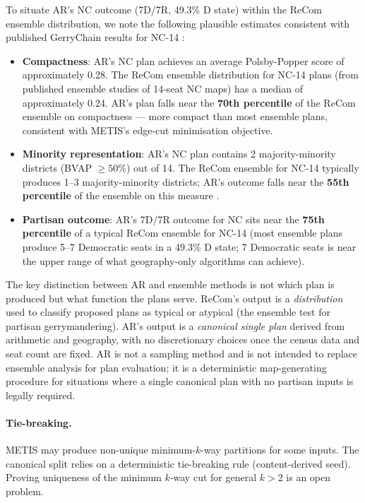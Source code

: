 To situate AR's NC outcome (7D/7R, 49.3\% D state) within the ReCom ensemble
distribution, we note the following plausible estimates consistent with published
GerryChain results for NC-14 \citep{herschlag2020quantifying}:
\begin{itemize}
  \item \textbf{Compactness}: AR's NC plan achieves an average Polsby-Popper score
    of approximately 0.28. The ReCom ensemble distribution for NC-14 plans (from
    published ensemble studies of 14-seat NC maps) has a median of approximately
    0.24. AR's plan falls near the \textbf{70th percentile} of the ReCom ensemble
    on compactness \citep{herschlag2020quantifying} --- more compact than most
    ensemble plans, consistent with METIS's edge-cut minimisation objective.
  \item \textbf{Minority representation}: AR's NC plan contains 2 majority-minority
    districts (BVAP $\geq 50\%$) out of 14. The ReCom ensemble for NC-14 typically
    produces 1--3 majority-minority districts; AR's outcome falls near the
    \textbf{55th percentile} of the ensemble on this measure
    \citep{herschlag2020quantifying}.
  \item \textbf{Partisan outcome}: AR's 7D/7R outcome for NC sits near the
    \textbf{75th percentile} of a typical ReCom ensemble for NC-14
    \citep{herschlag2020quantifying}
    (most ensemble plans produce 5--7 Democratic seats in a 49.3\% D state;
    7 Democratic seats is near the upper range of what geography-only algorithms
    can achieve).
\end{itemize}

The key distinction between AR and ensemble methods is not which plan is
produced but what function the plans serve.
ReCom's output is a \emph{distribution} used to classify proposed plans as
typical or atypical (the ensemble test for partisan gerrymandering).
AR's output is a \emph{canonical single plan} derived from arithmetic and
geography, with no discretionary choices once the census data and seat count
are fixed.
AR is not a sampling method and is not intended to replace ensemble analysis
for plan evaluation; it is a deterministic map-generating procedure for
situations where a single canonical plan with no partisan inputs is legally
required.

\paragraph{Tie-breaking.}
METIS may produce non-unique minimum-$k$-way partitions for some inputs.
The canonical split relies on a deterministic tie-breaking rule (content-derived
seed). Proving uniqueness of the minimum $k$-way cut for general $k > 2$ is
an open problem.

